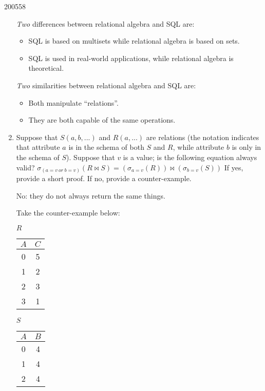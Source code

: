 \documentclass[10pt,\jkfside,a4paper]{article}
\begin{document}
\begin{examquestion}{2005}{5}{8}
\begin{enumerate}
\textit{Two} differences between relational algebra and SQL are:
\begin{itemize}
\item SQL is based on multisets while relational algebra is based on sets.
\item SQL is used in real-world applications, while relational algebra is theoretical.
\end{itemize}
\textit{Two} similarities between relational algebra and SQL are:
\begin{itemize}
\item Both manipulate ``relations''.
\item They are both capable of the same operations.
\end{itemize}

\item{Suppose that $S(a, b, . . .)$ and $R(a, . . .)$ are relations (the notation indicates
that attribute $a$ is in the schema of both $S$ and $R$, while attribute $b$ is only in
the schema of $S$). Suppose that $v$ is a value; is the following equation always
valid?
\newline
\newline
$\sigma_{(a=v\ or\ b=v)}(R \bowtie S) = (\sigma_{a=v}(R)) \bowtie (\sigma_{b=v}(S))$
\newline
\newline
If yes, provide a short proof. If no, provide a counter-example.}

No: they do not always return the same things.

Take the counter-example below:

\begin{center}
$R$
\begin{tabular}{|c|c|}
\hline
$A$ & $C$\\
\hline
0 & 5\\
1 & 2\\
2 & 3\\
3 & 1\\
\hline
\end{tabular}
\end{center}

\begin{center}
$S$
\begin{tabular}{|c|c|}
\hline
$A$ & $B$\\
\hline
0 & 4\\
1 & 4\\
2 & 4\\
\hline
\end{tabular}
\end{center}


\end{enumerate}
\end{examquestion}
\end{document}
